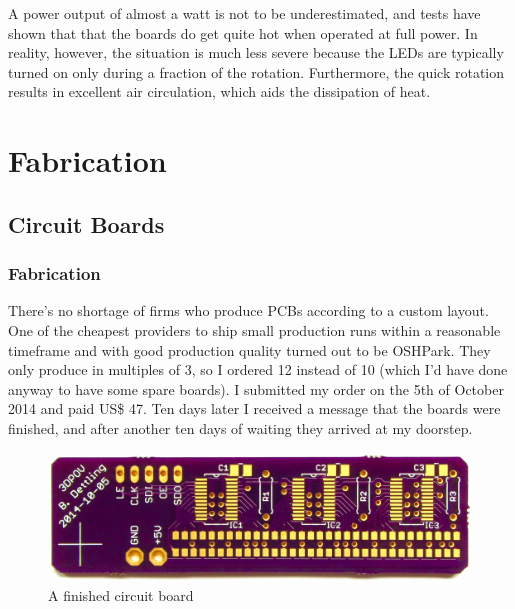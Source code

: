 \documentclass[a4paper, 11pt, titlepage]{report}
\begin{document}
A power output of almost a watt is not to be underestimated, and tests have shown that that the
boards do get quite hot when operated at full power. In reality, however, the situation is much
less severe because the LEDs are typically turned on only during a fraction of the rotation.
Furthermore, the quick rotation results in excellent air circulation, which aids the dissipation
of heat.









\chapter{Fabrication}

\section{Circuit Boards}

\subsection{Fabrication}

There's no shortage of firms who produce PCBs according to a custom layout. One of the cheapest
providers to ship small production runs within a reasonable timeframe and with good production
quality turned out to be OSHPark. They only produce in multiples of 3, so I ordered 12 instead of
10 (which I'd have done anyway to have some spare boards). I submitted my order on the 5th of
October 2014 and paid US\$ 47. Ten days later I received a message that the boards were finished,
and after another ten days of waiting they arrived at my doorstep.


\begin{figure}[h]
\vspace{3mm}
\includegraphics[width=\textwidth]{./images/board-finished.jpeg}
\vspace{-8mm}
\caption{A finished circuit board}
\end{figure}
\end{document}
